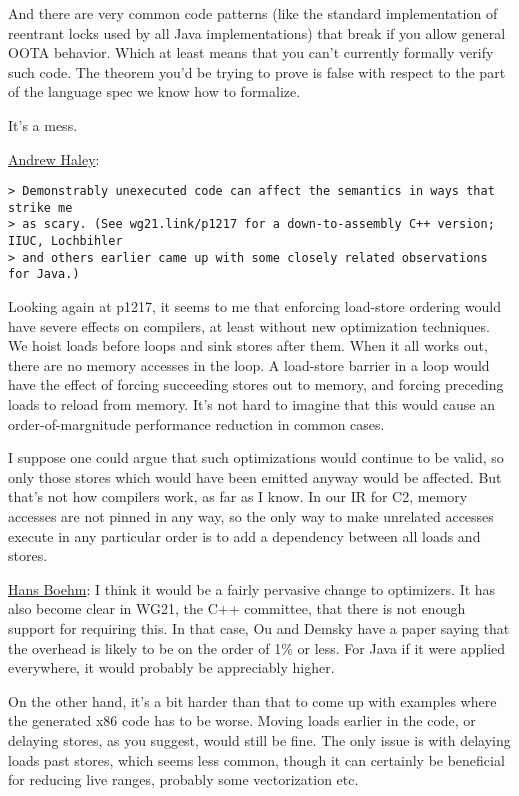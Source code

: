 And there are very common code
patterns (like the standard implementation of reentrant locks used
by all Java implementations) that break if you allow general OOTA
behavior. Which at least means that you can't currently formally verify such
code. The theorem you'd be trying to prove is false with respect to the
part of the language spec we know how to formalize.

It's a mess.


\bigskip

\href{https://mail.openjdk.java.net/pipermail/jmm-dev/2021-August/000447.html}{Andrew Haley}:
\begin{verbatim}
> Demonstrably unexecuted code can affect the semantics in ways that strike me 
> as scary. (See wg21.link/p1217 for a down-to-assembly C++ version; IIUC, Lochbihler 
> and others earlier came up with some closely related observations for Java.)
\end{verbatim}
Looking again at p1217, it seems to me that enforcing load-store
ordering would have severe effects on compilers, at least without new
optimization techniques. We hoist loads before loops and sink stores
after them. When it all works out, there are no memory accesses in the
loop. A load-store barrier in a loop would have the effect of forcing
succeeding stores out to memory, and forcing preceding loads to reload
from memory. It's not hard to imagine that this would cause an
order-of-margnitude performance reduction in common cases.

I suppose one could argue that such optimizations would continue to be
valid, so only those stores which would have been emitted anyway would
be affected. But that's not how compilers work, as far as I know. In
our IR for C2, memory accesses are not pinned in any way, so the only
way to make unrelated accesses execute in any particular order is to
add a dependency between all loads and stores.

\smallskip

\href{https://mail.openjdk.java.net/pipermail/jmm-dev/2021-August/000450.html}{Hans Boehm}:
I think it would be a fairly pervasive change to optimizers. It has also
become clear in WG21, the C++ committee, that there is not enough
support for requiring this. In that case, Ou and Demsky have a paper
saying that the overhead is likely to be on the order of 1\% or less.
For Java if it were applied everywhere, it would probably be
appreciably higher.

On the other hand, it's a bit harder than that to come up with examples
where
the generated x86 code has to be worse. Moving loads earlier in the
code, or delaying stores, as you suggest, would still be fine. The only
issue is with delaying loads past stores, which seems less common,
though it can certainly be beneficial for reducing live ranges, probably
some
vectorization etc.

